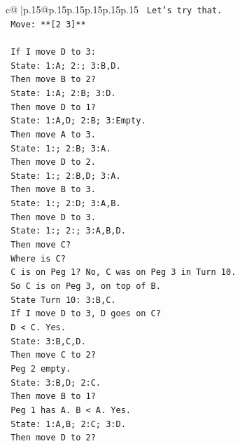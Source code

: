 \documentclass{article}
\begin{document}
{\begin{supertabular}{c@{$\;$}|p{.15\linewidth}@{}p{.15\linewidth}p{.15\linewidth}p{.15\linewidth}p{.15\linewidth}p{.15\linewidth}}
{{{\texttt{            Let's try that.} \\
\texttt{            Move: **{[}2 3{]}**} \\
\\ 
\texttt{            If I move D to 3:} \\
\texttt{            State: 1:A; 2:; 3:B,D.} \\
\texttt{            Then move B to 2?} \\
\texttt{            State: 1:A; 2:B; 3:D.} \\
\texttt{            Then move D to 1?} \\
\texttt{            State: 1:A,D; 2:B; 3:Empty.} \\
\texttt{            Then move A to 3.} \\
\texttt{            State: 1:; 2:B; 3:A.} \\
\texttt{            Then move D to 2.} \\
\texttt{            State: 1:; 2:B,D; 3:A.} \\
\texttt{            Then move B to 3.} \\
\texttt{            State: 1:; 2:D; 3:A,B.} \\
\texttt{            Then move D to 3.} \\
\texttt{            State: 1:; 2:; 3:A,B,D.} \\
\texttt{            Then move C?} \\
\texttt{            Where is C?} \\
\texttt{            C is on Peg 1? No, C was on Peg 3 in Turn 10.} \\
\texttt{            So C is on Peg 3, on top of B.} \\
\texttt{            State Turn 10: 3:B,C.} \\
\texttt{            If I move D to 3, D goes on C?} \\
\texttt{            D < C. Yes.} \\
\texttt{            State: 3:B,C,D.} \\
\texttt{            Then move C to 2?} \\
\texttt{            Peg 2 empty.} \\
\texttt{            State: 3:B,D; 2:C.} \\
\texttt{            Then move B to 1?} \\
\texttt{            Peg 1 has A. B < A. Yes.} \\
\texttt{            State: 1:A,B; 2:C; 3:D.} \\
\texttt{            Then move D to 2?} \\
}}}
\end{supertabular}}
\end{document}
